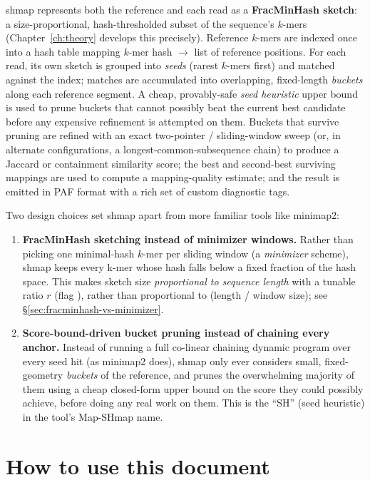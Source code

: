shmap represents both the reference and each read as a \textbf{FracMinHash sketch}: a
size-proportional, hash-thresholded subset of the sequence's $k$-mers (Chapter~\ref{ch:theory}
develops this precisely). Reference $k$-mers are indexed once into a hash table mapping
$k$-mer hash $\to$ list of reference positions. For each read, its own sketch is grouped into
\emph{seeds} (rarest $k$-mers first) and matched against the index; matches are accumulated into
overlapping, fixed-length \emph{buckets} along each reference segment. A cheap, provably-safe
\emph{seed heuristic} upper bound is used to prune buckets that cannot possibly beat the current
best candidate before any expensive refinement is attempted on them. Buckets that survive pruning
are refined with an exact two-pointer / sliding-window sweep (or, in alternate configurations, a
longest-common-subsequence chain) to produce a Jaccard or containment similarity score; the best
and second-best surviving mappings are used to compute a mapping-quality estimate; and the result
is emitted in PAF format with a rich set of custom diagnostic tags.

Two design choices set shmap apart from more familiar tools like minimap2:
\begin{enumerate}
  \item \textbf{FracMinHash sketching instead of minimizer windows.} Rather than picking one
    minimal-hash $k$-mer per sliding window (a \emph{minimizer} scheme), shmap keeps every k-mer
    whose hash falls below a fixed fraction of the hash space. This makes sketch size
    \emph{proportional to sequence length} with a tunable ratio $r$ (flag ), rather than
    proportional to (length / window size); see \S\ref{sec:fracminhash-vs-minimizer}.
  \item \textbf{Score-bound-driven bucket pruning instead of chaining every anchor.} Instead of
    running a full co-linear chaining dynamic program over every seed hit (as minimap2 does),
    shmap only ever considers small, fixed-geometry \emph{buckets} of the reference, and prunes
    the overwhelming majority of them using a cheap closed-form upper bound on the score they
    could possibly achieve, before doing any real work on them. This is the ``SH'' (seed
    heuristic) in the tool's Map-SHmap name.
\end{enumerate}

\section{How to use this document}

